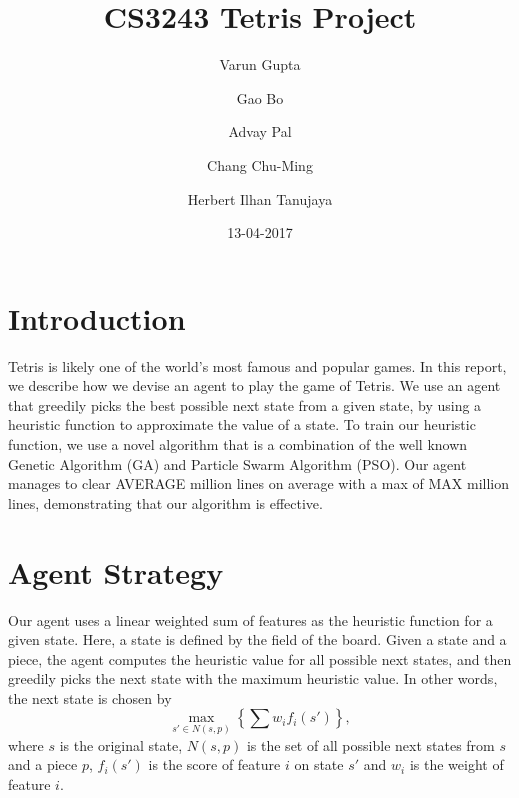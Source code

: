 \documentclass{article}
\title{CS3243 Tetris Project}
\author{Varun Gupta \and Gao Bo \and Advay Pal \and Chang Chu-Ming \and Herbert Ilhan Tanujaya}
\date{13-04-2017}
\begin{document}
	\maketitle
	\thispagestyle{empty}
	\vspace{5mm}

    \section{Introduction}
    Tetris is likely one of the world's most famous and popular games.
    In this report, we describe how we devise an agent to play the game of Tetris.
    We use an agent that greedily picks the best possible next state from a given state,
    by using a heuristic function to approximate the value of a state. To train our heuristic
    function, we use a novel algorithm that is a combination of the well known Genetic Algorithm (GA)
    and Particle Swarm Algorithm (PSO). Our agent manages to clear AVERAGE million lines on average with a max
    of MAX million lines, demonstrating that our algorithm is effective.

    \section{Agent Strategy}
	Our agent uses a linear weighted sum of features as the heuristic function for
	a given state. Here, a state is defined by the field of the board. Given a
	state and a piece, the agent computes the heuristic value for all possible next
	states, and then greedily picks the next state with the maximum heuristic
	value. In other words, the next state is chosen by \[ \max_{s' \in N(s, p)}
	\left\{ \sum w_i f_i(s') \right\}, \] where $s$ is the original state, $N(s,
	p)$ is the set of all possible next states from $s$ and a piece $p$, $f_i(s')$
	is the score of feature $i$ on state $s'$ and $w_i$ is the weight of feature
	$i$.
\end{document}
